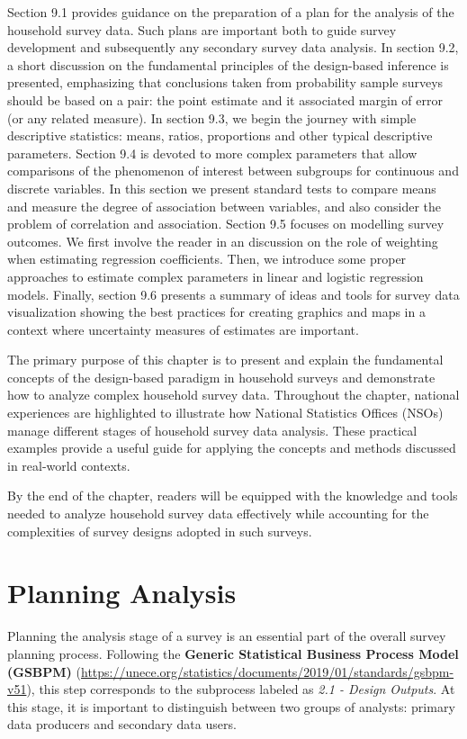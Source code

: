 \documentclass[
  12pt,
]{book}
\begin{document}
Section 9.1 provides guidance on the preparation of a plan for the analysis of the household survey data. Such plans are important both to guide survey development and subsequently any secondary survey data analysis. In section 9.2, a short discussion on the fundamental principles of the design-based inference is presented, emphasizing that conclusions taken from probability sample surveys should be based on a pair: the point estimate and it associated margin of error (or any related measure). In section 9.3, we begin the journey with simple descriptive statistics: means, ratios, proportions and other typical descriptive parameters. Section 9.4 is devoted to more complex parameters that allow comparisons of the phenomenon of interest between subgroups for continuous and discrete variables. In this section we present standard tests to compare means and measure the degree of association between variables, and also consider the problem of correlation and association. Section 9.5 focuses on modelling survey outcomes. We first involve the reader in an discussion on the role of weighting when estimating regression coefficients. Then, we introduce some proper approaches to estimate complex parameters in linear and logistic regression models. Finally, section 9.6 presents a summary of ideas and tools for survey data visualization showing the best practices for creating graphics and maps in a context where uncertainty measures of estimates are important.

The primary purpose of this chapter is to present and explain the fundamental concepts of the design-based paradigm in household surveys and demonstrate how to analyze complex household survey data. Throughout the chapter, national experiences are highlighted to illustrate how National Statistics Offices (NSOs) manage different stages of household survey data analysis. These practical examples provide a useful guide for applying the concepts and methods discussed in real-world contexts.

By the end of the chapter, readers will be equipped with the knowledge and tools needed to analyze household survey data effectively while accounting for the complexities of survey designs adopted in such surveys.

\hypertarget{planning-analysis}{%
\chapter{Planning Analysis}\label{planning-analysis}}

Planning the analysis stage of a survey is an essential part of the overall survey planning process. Following the \textbf{Generic Statistical Business Process Model (GSBPM)} (\url{https://unece.org/statistics/documents/2019/01/standards/gsbpm-v51}), this step corresponds to the subprocess labeled as \emph{2.1 - Design Outputs}. At this stage, it is important to distinguish between two groups of analysts: primary data producers and secondary data users.
\end{document}

